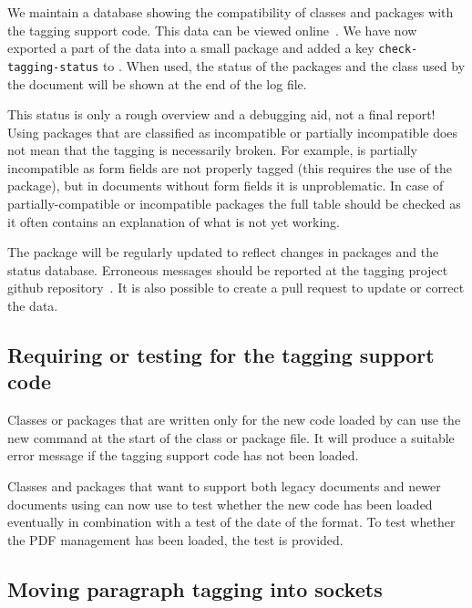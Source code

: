 \documentclass{ltnews}
\providecommand\Dash {\unskip \textemdash}
\begin{document}
We maintain a database showing the compatibility of classes and
packages with the tagging support code. This data can be viewed
online~\cite{tagging-status}.  We have now exported a part of the data
into a small package  and added a key
\texttt{check-tagging-status} to .  When used, the
status of the packages and the class used by the document will be
shown at the end of the log file.

%
This status is only a rough overview and a debugging aid, not a final report!
Using packages that are classified as incompatible or partially
incompatible does not mean that the tagging is necessarily broken. For
example,  is partially incompatible as form fields
are not properly tagged (this requires the use of the 
package), but in documents without form fields it is unproblematic.
In case of partially-compatible or incompatible packages the full
table should be checked as it often contains an explanation of what is
not yet working.
    
The package  will be regularly updated to
reflect changes in packages and the status database. Erroneous
messages should be reported at the tagging project
github repository~\cite{tagging-project}. It is also possible to create a pull
request to update or correct the data.


\subsection{Requiring or testing for the tagging support code}

Classes or packages that are written only for the new code loaded by
 can use the new command
 at the start of the class or package
file. It will produce a suitable error message if the tagging support
code has not been loaded.

Classes and packages that want to support both legacy documents and
newer documents using  can now use
 to test whether the new code has been loaded
\Dash eventually in combination with a test of the date of the format. To
test whether the PDF management has been loaded, the test
 is provided.

 
\subsection{Moving paragraph tagging into sockets}
\end{document}
